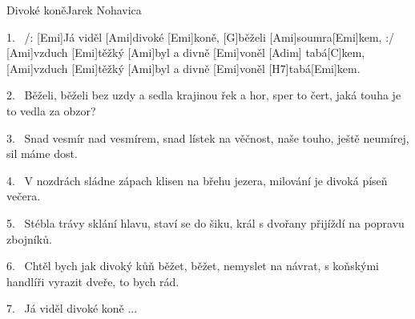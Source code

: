 \begin{song}{Divoké koně}{Jarek Nohavica}

\begin{xverse}{1.~}
/: [Emi]Já viděl [Ami]divoké [Emi]koně, [G]běželi [Ami]soumra[Emi]kem, :/
[Ami]vzduch [Emi]těžký [Ami]byl a divně [Emi]voněl [Adim]{\,\,}tabá[C]kem,
[Ami]vzduch [Emi]těžký [Ami]byl a divně [Emi]voněl [H7]tabá[Emi]kem.
\end{xverse}

\begin{xverse}{2.~}
Běželi, běželi bez uzdy a sedla krajinou řek a hor,
sper to čert, jaká touha je to vedla za obzor?
\end{xverse}

\begin{xverse}{3.~}
Snad vesmír nad vesmírem, snad lístek na věčnost,
naše touho, ještě neumírej, sil máme dost.
\end{xverse}

\begin{xverse}{4.~}
V nozdrách sládne zápach klisen na břehu jezera,
milování je divoká píseň večera.
\end{xverse}

\begin{xverse}{5.~}
Stébla trávy sklání hlavu, staví se do šiku,
král s dvořany přijíždí na popravu zbojníků.
\end{xverse}

\begin{xverse}{6.~}
Chtěl bych jak divoký kůň běžet, běžet, nemyslet na návrat,
s koňskými handlíři vyrazit dveře, to bych rád.
\end{xverse}

\begin{xverse}{7.~}
Já viděl divoké koně ...
\end{xverse}

\end{song}
\chords{\chordAdim}

